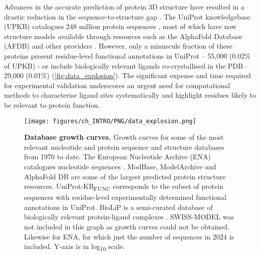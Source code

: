 Advances in the accurate prediction of protein 3D structure have resulted in a drastic reduction in the sequence-to-structure gap \cite{ABRAMSON_2024_ALPHAFOLD3}. The UniProt knowledgebase (UPKB) catalogues 248 million protein sequences \cite{UNIPROT_2018_UNIPROT, UNIPROT_2023_UNIPROT}, most of which have now structure models available through resources such as the AlphaFold Database (AFDB) \cite{VARADI_2022_ALPHAFOLDDB} and other providers \cite{GUEX_2009_SWISSMODEL, BEIENERT_2016_SWISSMODEL, WATERHOUSE_2018_SWISSMODEL}. However, only a minuscule fraction of these proteins present residue-level functional annotations in UniProt -- 55,000 (0.02\% of UPKB) - or include biologically relevant ligands co-crystallised in the PDB \cite{wwPDB_2019_PDB} -- 29,000 (0.01\%) (\autoref{fig:data_explosion}). The significant expense and time required for experimental validation underscores an urgent need for computational methods to characterise ligand sites systematically and highlight residues likely to be relevant to protein function.

\begin{figure}[htb!]
    \centering
    \texttt{[image: figures/ch\_INTRO/PNG/data\_explosion.png]}
    \caption[Database growth curves]{\textbf{Database growth curves.}  Growth curves for some of the most relevant nucleotide and protein sequence and structure databases from 1970 to date. The European Nucleotide Archive (ENA) catalogues nucleotide sequences \cite{LEINONEN_2010_ENA}. ModBase, ModelArchive and AlphaFold DB are some of the largest predicted protein structure resources. UniProt-KB\textsubscript{FUNC} corresponds to the subset of protein sequences with residue-level experimentally determined functional annotations in UniProt. BioLiP is a semi-curated database of biologically relevant protein-ligand complexes \cite{YANG_2013_BIOLIP}. SWISS-MODEL was not included in this graph as growth curves could not be obtained. Likewise for ENA, for which just the number of sequences in 2024 is included. Y-axis is in log\textsubscript{10} scale.}
    \label{fig:data_explosion}
\end{figure}

\newpage

